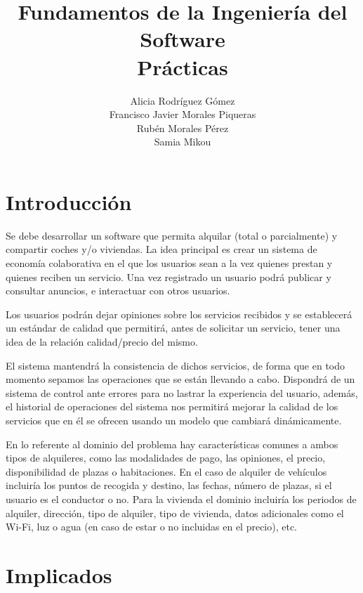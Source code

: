 \documentclass[11pt,spanish]{article} %
\title{Fundamentos de la Ingeniería del Software \\ Prácticas}
\author{Alicia Rodríguez Gómez \\ Francisco Javier Morales Piqueras\\ Rubén Morales Pérez\\ Samia Mikou}
\date{ }
\begin{document}
\maketitle
\tableofcontents %
\newpage
\setlength\parindent{0pt} %


\section{Introducción}
\hspace{0.5cm}Se debe desarrollar un software que permita alquilar (total o parcialmente) y compartir coches y/o viviendas. 
La idea principal es crear un sistema de economía colaborativa en el que los usuarios sean a la vez quienes prestan y quienes reciben un servicio. 
Una vez registrado un usuario podrá publicar y consultar anuncios, e interactuar con otros usuarios.

\hspace{0.5cm}Los usuarios podrán dejar opiniones sobre los servicios recibidos y se establecerá un estándar de calidad que permitirá, antes de solicitar un servicio, tener una idea de la relación calidad/precio del mismo.

\hspace{0.5cm}El sistema mantendrá la consistencia de dichos servicios, de forma que en todo momento sepamos las operaciones que se están llevando a cabo.
Dispondrá de un sistema de control ante errores para no lastrar la experiencia del usuario, además, el historial de operaciones del sistema nos permitirá mejorar la calidad de los servicios que en él se ofrecen usando un modelo que cambiará dinámicamente.

\hspace{0.5cm}En lo referente al dominio del problema hay características comunes a ambos tipos de alquileres, como las modalidades de pago, las opiniones, el precio, disponibilidad de plazas o habitaciones.
En el caso de alquiler de vehículos incluiría los puntos de recogida y destino, las fechas, número de plazas, si el usuario es el conductor o no.
Para la vivienda el dominio incluiría los periodos de alquiler, dirección, tipo de alquiler, tipo de vivienda, datos adicionales como el Wi-Fi, luz o agua (en caso de estar o no incluidas en el precio), etc.

\section{Implicados}
\end{document}
